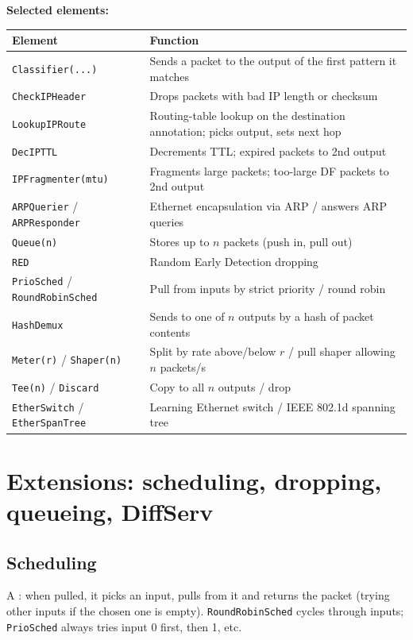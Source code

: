 \textbf{Selected elements:}
\begin{center}
\small
\begin{tabularx}{\linewidth}{@{}l X@{}}
\toprule
\textbf{Element} & \textbf{Function} \\
\midrule
\texttt{Classifier(...)} & Sends a packet to the output of the first pattern it matches \\
\texttt{CheckIPHeader} & Drops packets with bad IP length or checksum \\
\texttt{LookupIPRoute} & Routing-table lookup on the destination annotation; picks output, sets next hop \\
\texttt{DecIPTTL} & Decrements TTL; expired packets to 2nd output \\
\texttt{IPFragmenter(mtu)} & Fragments large packets; too-large DF packets to 2nd output \\
\texttt{ARPQuerier} / \texttt{ARPResponder} & Ethernet encapsulation via ARP / answers ARP queries \\
\texttt{Queue(n)} & Stores up to $n$ packets (push in, pull out) \\
\texttt{RED} & Random Early Detection dropping \\
\texttt{PrioSched} / \texttt{RoundRobinSched} & Pull from inputs by strict priority / round robin \\
\texttt{HashDemux} & Sends to one of $n$ outputs by a hash of packet contents \\
\texttt{Meter(r)} / \texttt{Shaper(n)} & Split by rate above/below $r$ / pull shaper allowing $n$ packets/s \\
\texttt{Tee(n)} / \texttt{Discard} & Copy to all $n$ outputs / drop \\
\texttt{EtherSwitch} / \texttt{EtherSpanTree} & Learning Ethernet switch / IEEE 802.1d spanning tree \\
\bottomrule
\end{tabularx}
\end{center}

\section{Extensions: scheduling, dropping, queueing, DiffServ}
\subsection{Scheduling}
A : when pulled, it picks an input, pulls from it and returns the packet (trying other inputs if the chosen one is empty). \texttt{RoundRobinSched} cycles through inputs; \texttt{PrioSched} always tries input 0 first, then 1, etc.

